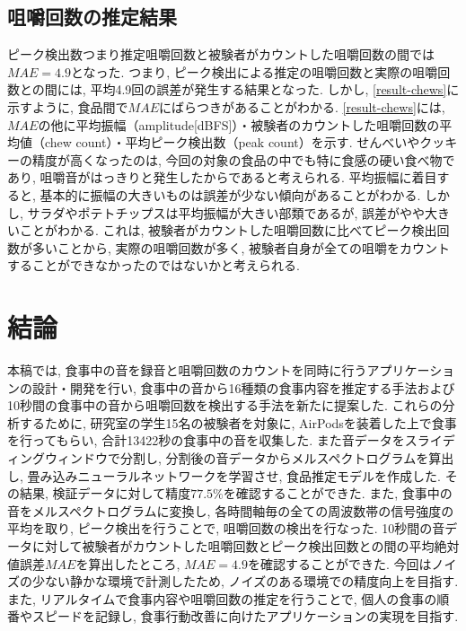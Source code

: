 \section{咀嚼回数の推定結果}

ピーク検出数つまり推定咀嚼回数と被験者がカウントした咀嚼回数の間では$MAE = 4.9$となった. つまり, ピーク検出による推定の咀嚼回数と実際の咀嚼回数との間には, 平均4.9回の誤差が発生する結果となった. しかし, \tablename\ref{result-chews}に示すように, 食品間で$MAE$にばらつきがあることがわかる. \tablename\ref{result-chews}には, $MAE$の他に平均振幅（amplitude[dBFS]）・被験者のカウントした咀嚼回数の平均値（chew count）・平均ピーク検出数（peak count）を示す. せんべいやクッキーの精度が高くなったのは, 今回の対象の食品の中でも特に食感の硬い食べ物であり, 咀嚼音がはっきりと発生したからであると考えられる. 平均振幅に着目すると, 基本的に振幅の大きいものは誤差が少ない傾向があることがわかる. しかし, サラダやポテトチップスは平均振幅が大きい部類であるが, 誤差がやや大きいことがわかる. これは, 被験者がカウントした咀嚼回数に比べてピーク検出回数が多いことから, 実際の咀嚼回数が多く, 被験者自身が全ての咀嚼をカウントすることができなかったのではないかと考えられる.

\chapter{結論}

本稿では, 食事中の音を録音と咀嚼回数のカウントを同時に行うアプリケーションの設計・開発を行い, 食事中の音から16種類の食事内容を推定する手法および10秒間の食事中の音から咀嚼回数を検出する手法を新たに提案した. これらの分析するために, 研究室の学生15名の被験者を対象に, AirPodsを装着した上で食事を行ってもらい, 合計13422秒の食事中の音を収集した. また音データをスライディングウィンドウで分割し, 分割後の音データからメルスペクトログラムを算出し, 畳み込みニューラルネットワークを学習させ, 食品推定モデルを作成した. その結果, 検証データに対して精度$77.5\%$を確認することができた. また, 食事中の音をメルスペクトログラムに変換し, 各時間軸毎の全ての周波数帯の信号強度の平均を取り, ピーク検出を行うことで, 咀嚼回数の検出を行なった. 10秒間の音データに対して被験者がカウントした咀嚼回数とピーク検出回数との間の平均絶対値誤差$MAE$を算出したところ, $MAE = 4.9$を確認することができた. 今回はノイズの少ない静かな環境で計測したため, ノイズのある環境での精度向上を目指す. また, リアルタイムで食事内容や咀嚼回数の推定を行うことで, 個人の食事の順番やスピードを記録し, 食事行動改善に向けたアプリケーションの実現を目指す.
